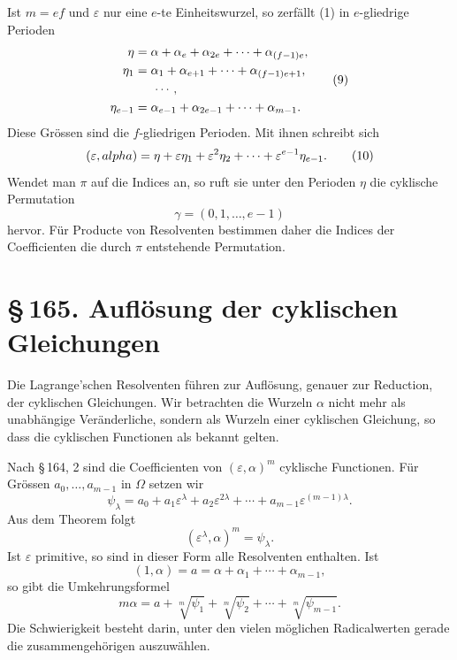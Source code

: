 \documentclass[11pt]{article}
\providecommand{\sect}[2]{\section*{\S\,#1. #2}}
\begin{document}
Ist $m=ef$ und $\varepsilon$ nur eine $e$-te Einheitswurzel, so zerfällt (1) in $e$-gliedrige Perioden
\[
\begin{aligned}
\eta      &=\alpha+\alpha_e+\alpha_{2e}+\cdots+\alpha_{(f-1)e},\\
\eta_1    &=\alpha_1+\alpha_{e+1}+\cdots+\alpha_{(f-1)e+1},\\
&\hspace{1.5em}\cdots,\\
\eta_{e-1}&=\alpha_{e-1}+\alpha_{2e-1}+\cdots+\alpha_{m-1}.
\end{aligned}                                                          \tag{9}
\]
Diese Grössen sind die $f$-gliedrigen Perioden. Mit ihnen schreibt sich
\[
        (\varepsilon,\\alpha)=
        \eta+\varepsilon\eta_1+
        \varepsilon^2\eta_2+
        \cdots+
        \varepsilon^{e-1}\eta_{e-1}.                                    \tag{10}
\]
Wendet man $\pi$ auf die Indices an, so ruft sie unter den Perioden $\eta$ die cyklische Permutation
\[
        \gamma=(0,1,
        \ldots,e-1)                                                     \tag{11}
\]
hervor. Für Producte von Resolventen bestimmen daher die Indices der Coefficienten die durch $\pi$ entstehende Permutation.

\sect{165}{Auflösung der cyklischen Gleichungen}

Die Lagrange'schen Resolventen führen zur Auflösung, genauer zur Reduction, der cyklischen Gleichungen. Wir betrachten die Wurzeln $\alpha$ nicht mehr als unabhängige Veränderliche, sondern als Wurzeln einer cyklischen Gleichung, so dass die cyklischen Functionen als bekannt gelten.

Nach \S\,164, 2 sind die Coefficienten von $(\varepsilon,\alpha)^m$ cyklische Functionen. Für Grössen $a_0,
\ldots,a_{m-1}$ in $\Omega$ setzen wir
\[
        \psi_\lambda=a_0+a_1\varepsilon^\lambda+
        a_2\varepsilon^{2\lambda}+
        \cdots+a_{m-1}\varepsilon^{(m-1)\lambda}.                      \tag{1}
\]
Aus dem Theorem folgt
\[
        (\varepsilon^\lambda,\alpha)^m=\psi_\lambda.                    \tag{2}
\]
Ist $\varepsilon$ primitive, so sind in dieser Form alle Resolventen enthalten. Ist
\[
        (1,\alpha)=a=\alpha+\alpha_1+\cdots+\alpha_{m-1},
\]
so gibt die Umkehrungsformel
\[
        m\alpha=a+\sqrt[m]{\psi_1}+\sqrt[m]{\psi_2}+
        \cdots+
        \sqrt[m]{\psi_{m-1}}.                                           \tag{3}
\]
Die Schwierigkeit besteht darin, unter den vielen möglichen Radicalwerten gerade die zusammengehörigen auszuwählen.
\end{document}
